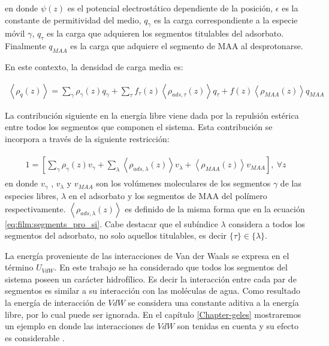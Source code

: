 \noindent en donde $\psi(z)$ es el potencial electrost\'atico dependiente de la posici\'on, $\epsilon$ es la constante de permitividad del medio, $q_\gamma$ es la carga correspondiente a la especie m\'ovil $\gamma$, $q_\tau$ es la carga que adquieren los segmentos titulables del adsorbato. Finalmente $q_{MAA}$ es la carga que adquiere el segmento de MAA al desprotonarse.


En este contexto, la densidad de carga media es:

\begin{align}
	\left<\rho_q(z)\right> = \sum_{\gamma } {\rho_\gamma(z) q_\gamma + \sum_\tau{f_\tau(z) \left<\rho_{ads,\tau}(z)\right> q_\tau} +  f(z)\left<\rho_{MAA}(z)\right>}q_{MAA}
	\label{eq:film:rho_charge}
\end{align}

La contribuci\'on siguiente en la energ\'ia libre viene dada por la repulsi\'on est\'erica entre  todos los segmentos que componen  el sistema. Esta contribuci\'on se incorpora a trav\'es de la siguiente restricci\'on:  

\begin{align}
	\begin{aligned}
		1=  {\left[\sum_{\gamma}\rho_\gamma(z) v_\gamma + \sum_\lambda{\left<\rho_{ads,\lambda}(z)\right>v_\lambda} + \left<\rho_{MAA}(z)\right>v_{MAA} \right]},~ \forall z
	\end{aligned}
	\label{eq:film:constraint}
\end{align}
\noindent en donde $v_\gamma$ , $v_\lambda$ y $v_{MAA}$ son los vol\'umenes moleculares de los segmentos $\gamma$ de las especies libres, $\lambda$  en el adsorbato y los segmentos de MAA del pol\'imero respectivamente.
$\left<\rho_{ads,\lambda}(z)\right>$ es definido de la misma forma que en la ecuaci\'on  \ref{eq:film:segments_pro_si}.
Cabe destacar que el sub\'indice $\lambda$ considera a todos los segmentos del adsorbato, no solo aquellos titulables, es decir $ \{\tau \}  \in \{\lambda \}$.

La energ\'ia proveniente de las interacciones de Van der Waals se expresa en el t\'ermino $U_{VdW}$. En este trabajo se ha considerado que todos los segmentos del sistema poseen un car\'acter hidrof\'ilico. Es decir la interacci\'on entre cada par de segmentos es similar a su interacci\'on con las mol\'eculas de agua. Como resultado la energ\'ia de interacci\'on de $VdW$ se considera una constante aditiva a la energ\'ia libre, por lo cual puede ser ignorada. En el cap\'itulo \ref{Chapter-geles} mostraremos un ejemplo en donde las interacciones de $VdW$ son tenidas en cuenta y su efecto es considerable . 

